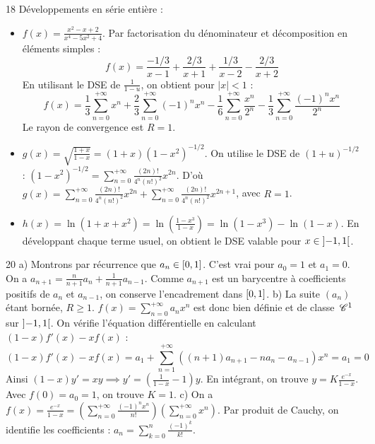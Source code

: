 \begin{correction}{18}
Développements en série entière :
\begin{itemize}
 \item $f(x) = \frac{x^2-x+2}{x^4-5x^2+4}$. Par factorisation du dénominateur et décomposition en éléments simples : 
 $$ f(x) = \frac{-1/3}{x-1} + \frac{2/3}{x+1} + \frac{1/3}{x-2} - \frac{2/3}{x+2} $$ 
 En utilisant le DSE de $\frac{1}{1-u}$, on obtient pour $|x|<1$ : 
 $$ f(x) = \frac{1}{3} \sum_{n=0}^{+\infty} x^n + \frac{2}{3} \sum_{n=0}^{+\infty} (-1)^n x^n - \frac{1}{6} \sum_{n=0}^{+\infty} \frac{x^n}{2^n} - \frac{1}{3} \sum_{n=0}^{+\infty} \frac{(-1)^n x^n}{2^n} $$ 
 Le rayon de convergence est $R=1$. 
 \item $g(x) = \sqrt{\frac{1+x}{1-x}} = (1+x)(1-x^2)^{-1/2}$. 
 On utilise le DSE de $(1+u)^{-1/2}$ : $(1-x^2)^{-1/2} = \sum_{n=0}^{+\infty} \frac{(2n)!}{4^n (n!)^2} x^{2n}$. 
 D'où $g(x) = \sum_{n=0}^{+\infty} \frac{(2n)!}{4^n (n!)^2} x^{2n} + \sum_{n=0}^{+\infty} \frac{(2n)!}{4^n (n!)^2} x^{2n+1}$, avec $R=1$. 
 \item $h(x) = \ln(1+x+x^2) = \ln\left(\frac{1-x^3}{1-x}\right) = \ln(1-x^3) - \ln(1-x)$. 
 En développant chaque terme usuel, on obtient le DSE valable pour $x \in \left]-1, 1\right[$. 
\end{itemize}
\end{correction}

\begin{correction}{20}
a) Montrons par récurrence que $a_n \in \left[0, 1\right]$. C'est vrai pour $a_0=1$ et $a_1=0$. 
On a $a_{n+1} = \frac{n}{n+1}a_n + \frac{1}{n+1}a_{n-1}$. Comme $a_{n+1}$ est un barycentre à coefficients positifs de $a_n$ et $a_{n-1}$, on conserve l'encadrement dans $\left[0, 1\right]$. 
b) La suite $(a_n)$ étant bornée, $R \ge 1$. $f(x) = \sum_{n=0}^{+\infty} a_n x^n$ est donc bien définie et de classe $\,\mathscr C^{1}$ sur $\left]-1, 1\right[$. 
On vérifie l'équation différentielle en calculant $(1-x)f'(x) - xf(x)$ : 
$$ (1-x)f'(x) - xf(x) = a_1 + \sum_{n=1}^{+\infty} \left( (n+1)a_{n+1} - na_n - a_{n-1} \right) x^n = a_1 = 0 $$ 
Ainsi $(1-x)y' = xy \implies y' = \left(\frac{1}{1-x} - 1\right)y$. 
En intégrant, on trouve $y = K \frac{e^{-x}}{1-x}$. Avec $f(0)=a_0=1$, on trouve $K=1$. 
c) On a $f(x) = \frac{e^{-x}}{1-x} = \left(\sum_{n=0}^{+\infty} \frac{(-1)^n x^n}{n!}\right) \left(\sum_{n=0}^{+\infty} x^n\right)$. 
Par produit de Cauchy, on identifie les coefficients : $a_n = \sum_{k=0}^n \frac{(-1)^k}{k!}$. 
\end{correction}

